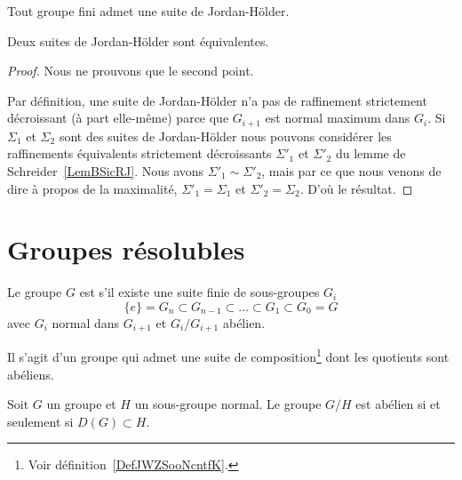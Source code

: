 \begin{theorem}\label{ThoLgxWIC}
    Tout groupe fini admet une suite de Jordan-Hölder.

    Deux suites de Jordan-Hölder sont équivalentes.
\end{theorem}

\begin{proof}
    Nous ne prouvons que le second point.

    Par définition, une suite de Jordan-Hölder n'a pas de raffinement strictement décroissant (à part elle-même) parce que \( G_{i+1}\) est normal maximum dans \( G_i\). Si \( \Sigma_1\) et \( \Sigma_2\) sont des suites de Jordan-Hölder nous pouvons considérer les raffinements équivalents strictement décroissants \( \Sigma'_1\) et \( \Sigma'_2\) du lemme de Schreider~\ref{LemBSicRJ}. Nous avons \( \Sigma'_1\sim\Sigma'_2\), mais par ce que nous venons de dire à propos de la maximalité, \( \Sigma'_1=\Sigma_1\) et \( \Sigma'_2=\Sigma_2\). D'où le résultat.
\end{proof}

\section{Groupes résolubles}

\begin{definition}  \label{DefOSYNooTROIKs}
    Le groupe \( G\) est  s'il existe une suite finie de sous-groupes \( G_i\)
    \begin{equation}
        \{ e \}=G_n\subset G_{n-1}\subset\ldots\subset G_1\subset G_0=G
    \end{equation}
    avec \( G_i\) normal dans \( G_{i+1}\) et \( G_i/G_{i+1}\) abélien.
\end{definition}
Il s'agit d'un groupe qui admet une suite de composition\footnote{Voir définition~\ref{DefJWZSooNcntfK}.} dont les quotients sont abéliens.

\begin{lemma}   \label{LemOARMooYhYmbH}
    Soit \( G\) un groupe et \( H\) un sous-groupe normal. Le groupe \( G/H\) est abélien si et seulement si \( D(G)\subset H\).
\end{lemma}

